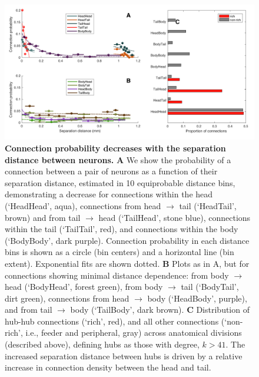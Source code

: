 \documentclass[10pt,letterpaper]{article}
\begin{document}
\begin{figure}[h]
\centering
    \includegraphics[width=1\textwidth]{ConnectionProbability.pdf}
\caption{
\label{fig:S_connProbability}
\textbf{Connection probability decreases with the separation distance between neurons.}
\textbf{A}
We show the probability of a connection between a pair of neurons as a function of their separation distance, estimated in 10 equiprobable distance bins, demonstrating a decrease for connections within the head (`HeadHead', aqua), connections from head $\rightarrow$ tail (`HeadTail', brown) and from tail $\rightarrow$ head (`TailHead', stone blue), connections within the tail (`TailTail', red), and connections within the body (`BodyBody', dark purple).
Connection probability in each distance bins is shown as a circle (bin centers) and a horizontal line (bin extent).
Exponential fits are shown dotted.
\textbf{B}
Plots as in A, but for connections showing minimal distance dependence: from body $\rightarrow$ head (`BodyHead', forest green), from body $\rightarrow$ tail (`BodyTail', dirt green), connections from head $\rightarrow$ body (`HeadBody', purple), and from tail $\rightarrow$ body (`TailBody', dark brown).
\textbf{C}
Distribution of hub-hub connections (`rich', red), and all other connections (`non-rich', i.e., feeder and peripheral, gray) across anatomical divisions (described above), defining hubs as those with degree, $k > 41$.
The increased separation distance between hubs is driven by a relative increase in connection density between the head and tail.
}
\end{figure}
\end{document}
